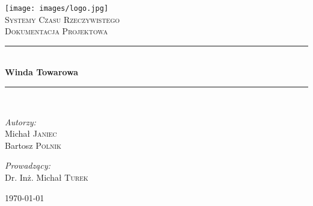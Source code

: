 \documentclass[a4paper,11pt]{article}
\newcommand{\HRule}{\rule{\linewidth}{0.5mm}}
\begin{document}
\begin{titlepage}
    \begin{center}
        \texttt{[image: images/logo.jpg]} \\[1cm]
        \textsc{\LARGE Systemy Czasu Rzeczywistego} \\[0.8cm]
        \textsc{\LARGE Dokumentacja Projektowa} \\[0.5cm]
        \HRule \\[0.4cm]
        { \huge \bfseries Winda Towarowa} \\[0.4cm]
        \HRule \\[1.5cm]
    
    \begin{minipage}{0.4\textwidth}
        \begin{flushleft} \large
        \emph{Autorzy:} \\
        Michał \textsc{Janiec} \\
        Bartosz \textsc{Polnik}
        \end{flushleft}
    \end{minipage}
    \begin{minipage}{0.4\textwidth}
        \begin{flushright} \large
            \emph{Prowadzący:} \\
            Dr. Inż. Michał \textsc{Turek}
        \end{flushright}
    \end{minipage}

    \vfill

    {\large \today}

    \end{center}
\end{titlepage}
\end{document}
